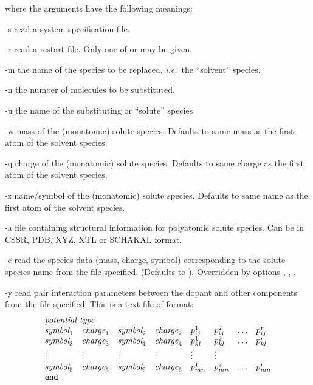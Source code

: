 \documentclass[a4paper,twoside]{report}
\newcommand{\ie}{\emph{i.e.}}
\begin{document}
where the arguments have the following meanings:
\begin{Argdescription}
\item[-s] read a system specification file.
\item[-r] read a restart file. Only one of  or  may be given.
\item[-m] the name of the species to be replaced, \ie\ the ``solvent''
  species.
\item[-n] the number of molecules to be substituted.
\item[-u] the name of the substituting or ``solute'' species.
\item[-w] mass of the (monatomic) solute species. Defaults to same mass as the
  first atom of the solvent species.
\item[-q] charge of the (monatomic) solute species. Defaults to same charge as the
  first atom of the solvent species.
\item[-z] name/symbol of the (monatomic) solute species. Defaults to same name as the
  first atom of the solvent species.
\item[-a] file containing structural information for polyatomic solute species. Can be in CSSR, PDB, XYZ, XTL 
  or SCHAKAL format.
\item[-e] read the species data (mass, charge, symbol) corresponding to the
solute species name from the file specified.
(Defaults to ). Overridden  by options , , .
\item[-y] read pair interaction parameters between the dopant and other components
from the file specified. This is a text file of format:
\begin{displaymath}
\begin{array}{llllllll}
\multicolumn{4}{l}{\textit{potential-type}} \\
\textit{symbol}_1 & \textit{charge}_1 & \textit{symbol}_2 & \textit{charge}_2
 & p^{1}_{ij} & p^{2}_{ij} & \ldots & p^{r}_{ij}  \\
\textit{symbol}_3 & \textit{charge}_3 & \textit{symbol}_4 & \textit{charge}_4
 & p^{1}_{kl} & p^{2}_{kl} & \ldots & p^{r}_{kl}  \\
\vdots & \vdots & \vdots & \vdots & \vdots & \vdots \\
\textit{symbol}_5 & \textit{charge}_5 & \textit{symbol}_6 & \textit{charge}_6
 & p^{1}_{mn} & p^{2}_{mn} & \ldots & p^{r}_{mn}  \\
\Lit{end} \\
\end{array}

\end{displaymath}
\end{Argdescription}
\end{document}
